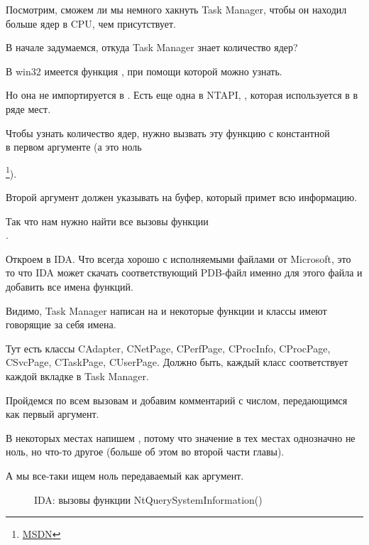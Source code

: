 ﻿

Посмотрим, сможем ли мы немного хакнуть Task Manager, чтобы он находил больше ядер в \ac{CPU}, чем присутствует.

В начале задумаемся, откуда Task Manager знает количество ядер?

В win32 имеется функция , при помощи которой можно узнать.

Но она не импортируется в .
Есть еще одна в \gls{NTAPI}, , которая используется в 
 в ряде мест.

Чтобы узнать количество ядер, нужно вызвать эту функцию с константной \\
 в первом аргументе (а это ноль

\footnote{\href{http://go.yurichev.com/17251}{MSDN}}).

Второй аргумент должен указывать на буфер, который примет всю информацию.

Так что нам нужно найти все вызовы функции \\
.

Откроем  в IDA. 
Что всегда хорошо с исполняемыми файлами от Microsoft, это то что IDA может скачать соответствующий 
\gls{PDB}-файл именно для этого файла и добавить все имена функций.

Видимо, Task Manager написан на \Cpp и некоторые функции и классы имеют говорящие за себя имена.

Тут есть классы CAdapter, CNetPage, CPerfPage, CProcInfo, CProcPage, CSvcPage, 
CTaskPage, CUserPage.
Должно быть, каждый класс соответствует каждой вкладке в Task Manager.

Пройдемся по всем вызовам и добавим комментарий с числом, передающимся как первый аргумент.

В некоторых местах напишем , потому что значение в тех местах однозначно не ноль, 
но что-то другое (больше об этом во второй части главы).%

А мы все-таки ищем ноль передаваемый как аргумент.

\begin{figure}[H]
\centering
{}
\caption{IDA: вызовы функции NtQuerySystemInformation()}
\end{figure}

